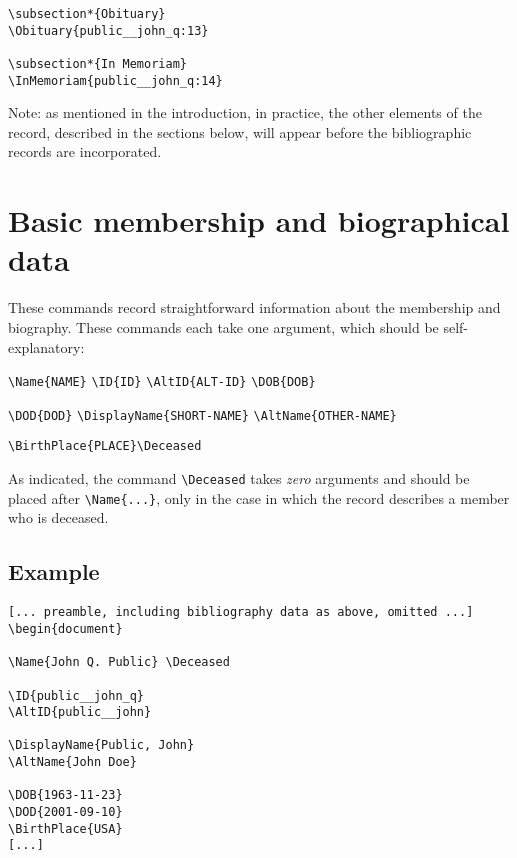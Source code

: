 \documentclass[letterpaper]{article}
\begin{document}
\begin{verbatim}
\subsection*{Obituary}
\Obituary{public__john_q:13}       

\subsection*{In Memoriam}
\InMemoriam{public__john_q:14}
\end{verbatim}

Note: as mentioned in the introduction, in practice, the other
elements of the record, described in the sections below, will appear
before the bibliographic records are incorporated.


\section{Basic membership and biographical data}

These commands record straightforward information about the membership
and biography.  These commands each take one argument, which should be
self-explanatory:

\begin{mdframed}
\verb|\Name{NAME}|\quad
\verb|\ID{ID}|\quad
\verb|\AltID{ALT-ID}|\quad
\verb|\DOB{DOB}|

\verb|\DOD{DOD}|\quad
\verb|\DisplayName{SHORT-NAME}|\quad
\verb|\AltName{OTHER-NAME}|

\verb|\BirthPlace{PLACE}|\quad \verb|\Deceased|
\end{mdframed}

As indicated, the command \verb|\Deceased| takes \emph{zero} arguments
and should be placed after \verb|\Name{...}|, only in the case in
which the record describes a member who is deceased.

\subsection*{Example}

\begin{verbatim}
[... preamble, including bibliography data as above, omitted ...]
\begin{document}

\Name{John Q. Public} \Deceased

\ID{public__john_q}
\AltID{public__john}

\DisplayName{Public, John}
\AltName{John Doe}

\DOB{1963-11-23}
\DOD{2001-09-10}
\BirthPlace{USA}
[...]
\end{verbatim}
\end{document}
